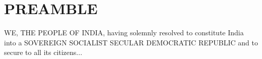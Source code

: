\section*{PREAMBLE} 
 
WE, THE PEOPLE OF INDIA, having solemnly resolved to constitute 
India into a SOVEREIGN SOCIALIST SECULAR DEMOCRATIC REPUBLIC 
and to secure to all its citizens... 
